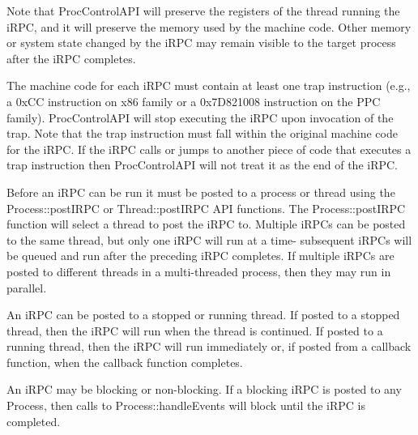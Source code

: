Note that ProcControlAPI will preserve the registers of the thread running the
iRPC, and it will preserve the memory used by the machine code. Other memory
or system state changed by the iRPC may remain visible to the target process
after the iRPC completes.

The machine code for each iRPC must contain at least one trap instruction (e.g.,
a 0xCC instruction on x86 family or a 0x7D821008 instruction on the PPC
family). ProcControlAPI will stop executing the iRPC upon invocation of the
trap. Note that the trap instruction must fall within the original machine
code for the iRPC. If the iRPC calls or jumps to another piece of code that
executes a trap instruction then ProcControlAPI will not treat it as the end of
the iRPC.

Before an iRPC can be run it must be posted to a process or thread using the
Process::postIRPC or
Thread::postIRPC API functions. The
Process::postIRPC function will select a thread to post the iRPC to.
Multiple iRPCs can be posted to the same thread, but only one iRPC will run
at a time- subsequent iRPCs will be queued and run after
the preceding iRPC completes. If multiple iRPCs are posted to different
threads in a multi-threaded process, then they may run in parallel.

An iRPC can be posted to a stopped or running thread. If posted to a stopped
thread, then the iRPC will run when the thread is continued. If posted to a
running thread, then the iRPC will run immediately or, if posted from a
callback function, when the callback function completes.

An iRPC may be blocking or non-blocking. If a blocking iRPC is posted to any
Process, then calls to Process::handleEvents will block until the iRPC is completed.
